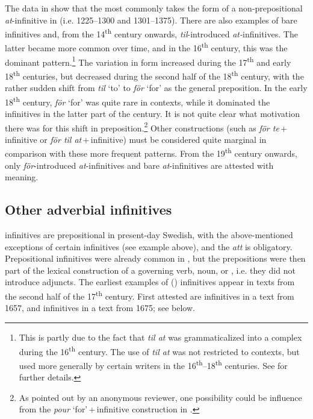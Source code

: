 \documentclass[output=paper]{langscibook}
\begin{document}
The data in  show that the  most commonly takes the form of a non-prepositional \textit{at}{}-infinitive in  (i.e. 1225–1300 and 1301–1375). There are also examples of bare infinitives and, from the 14\textsuperscript{th} century onwards, \textit{til}{}-introduced \textit{at-}infinitives. The latter became more common over time, and in the 16\textsuperscript{th} century, this was the dominant pattern.\footnote{This is partly due to the fact that \textit{til at} was grammaticalized into a complex  during the 16\textsuperscript{th} century. The use of \textit{til at} was not restricted to  contexts, but used more generally by certain writers in the 16\textsuperscript{th}–18\textsuperscript{th} centuries. See \textcites[]{Kalm2016Prepositioner}[203–221]{Kalm2016Satsekvivalenta} for further details.} The variation in form increased during the 17\textsuperscript{th} and early 18\textsuperscript{th} centuries, but decreased during the second half of the 18\textsuperscript{th} century, with the rather sudden shift from \textit{til} ‘to’ to \textit{för} ‘for’ as the general  preposition. In the early 18\textsuperscript{th} century, \textit{för} ‘for’ was quite rare in  contexts, while it dominated the  infinitives in the latter part of the century. It is not quite clear what motivation there was for this shift in  preposition.\footnote{As pointed out by an anonymous reviewer, one possibility could be influence from the  \textit{pour} ‘for’\,+\,infinitive construction in .}  Other constructions (such as \textit{för te}\,+\,infinitive or \textit{för til at}\,+\,infinitive) must be considered quite marginal in comparison with these more frequent patterns. From the 19\textsuperscript{th} century onwards, only \textit{för}{}-introduced \textit{at}{}-infinitives and bare \textit{at}{}-infinitives are attested with  meaning. 


\subsection{Other adverbial infinitives}\label{sec:kalm:4.2}

 infinitives are prepositional in present-day Swedish, with the above-mentioned exceptions of certain  infinitives (see example  above), and the  \textit{att} is obligatory. Prepositional infinitives were already common in , but the prepositions were then part of the lexical construction of a governing verb, noun, or , i.e. they did not introduce  adjuncts. The earliest examples of  () infinitives appear in texts from the second half of the 17\textsuperscript{th} century. First attested are  infinitives in a text from 1657, and  infinitives in a text from 1675; see  below. 
\end{document}
